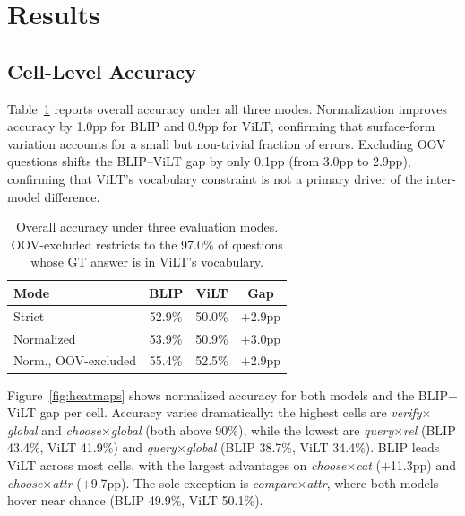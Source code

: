 \documentclass[11pt]{article}
\begin{document}
\section{Results}
\label{sec:results}

\subsection{Cell-Level Accuracy}
\label{sec:results_cell}

Table~\ref{tab:overall} reports overall accuracy under all three modes. Normalization improves accuracy by 1.0pp for BLIP and 0.9pp for ViLT, confirming that surface-form variation accounts for a small but non-trivial fraction of errors. Excluding OOV questions shifts the BLIP--ViLT gap by only 0.1pp (from 3.0pp to 2.9pp), confirming that ViLT's vocabulary constraint is not a primary driver of the inter-model difference.

\begin{table}[h]
\centering
\small
\begin{tabular}{lccc}
\toprule
\textbf{Mode} & \textbf{BLIP} & \textbf{ViLT} & \textbf{Gap} \\
\midrule
Strict                    & 52.9\% & 50.0\% & $+$2.9pp \\
Normalized                & 53.9\% & 50.9\% & $+$3.0pp \\
Norm., OOV-excluded       & 55.4\% & 52.5\% & $+$2.9pp \\
\bottomrule
\end{tabular}
\caption{Overall accuracy under three evaluation modes. OOV-excluded restricts to the 97.0\% of questions whose GT answer is in ViLT's vocabulary.}
\label{tab:overall}
\end{table}

Figure~\ref{fig:heatmaps} shows normalized accuracy for both models and the BLIP$-$ViLT gap per cell. Accuracy varies dramatically: the highest cells are \textit{verify}$\times$\textit{global} and \textit{choose}$\times$\textit{global} (both above 90\%), while the lowest are \textit{query}$\times$\textit{rel} (BLIP 43.4\%, ViLT 41.9\%) and \textit{query}$\times$\textit{global} (BLIP 38.7\%, ViLT 34.4\%). BLIP leads ViLT across most cells, with the largest advantages on \textit{choose}$\times$\textit{cat} ($+$11.3pp) and \textit{choose}$\times$\textit{attr} ($+$9.7pp). The sole exception is \textit{compare}$\times$\textit{attr}, where both models hover near chance (BLIP 49.9\%, ViLT 50.1\%).
\end{document}
